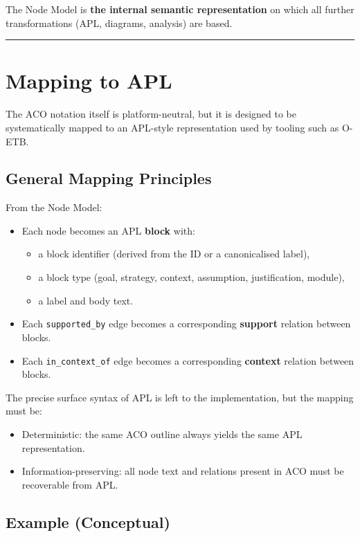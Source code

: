 \documentclass[11pt]{article}
\begin{document}
The Node Model is \textbf{the internal semantic representation} on which all further transformations (APL, diagrams, analysis) are based.

\bigskip
\hrule
\bigskip

\section{Mapping to APL}

The ACO notation itself is platform-neutral, but it is designed to be systematically mapped to an APL-style representation used by tooling such as O-ETB.

\subsection{General Mapping Principles}

From the Node Model:
\begin{itemize}[leftmargin=2em]
  \item Each node becomes an APL \textbf{block} with:
  \begin{itemize}[leftmargin=1.5em]
    \item a block identifier (derived from the ID or a canonicalised label),
    \item a block type (goal, strategy, context, assumption, justification, module),
    \item a label and body text.
  \end{itemize}

  \item Each \texttt{supported\_by} edge becomes a corresponding \textbf{support} relation between blocks.

  \item Each \texttt{in\_context\_of} edge becomes a corresponding \textbf{context} relation between blocks.
\end{itemize}

The precise surface syntax of APL is left to the implementation, but the mapping must be:
\begin{itemize}[leftmargin=2em]
  \item Deterministic: the same ACO outline always yields the same APL representation.
  \item Information-preserving: all node text and relations present in ACO must be recoverable from APL.
\end{itemize}

\subsection{Example (Conceptual)}
\end{document}
